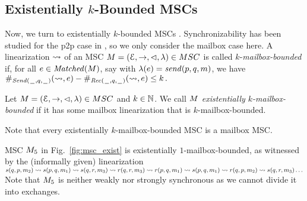 \documentclass[a4paper,UKenglish,cleveref, autoref, thm-restate]{lipics-v2021}
\begin{document}

\subsection{Existentially $k$-Bounded MSCs}

Now, we turn to existentially $k$-bounded MSCs \cite{DBLP:conf/fossacs/LohreyM02,DBLP:conf/dlt/GenestMK04,GKM07}.
Synchronizability has been studied for the p2p case in \cite{GKM07}, so we only consider the mailbox case here.
A linearization $\rightsquigarrow$ of an MSC $\msc = (\Events,\procrel,\lhd,\lambda) \in \MSCs$ is called
$k$-\emph{mailbox-bounded} if, for all $e \in \mathit{Matched}(M)$, say with $\lambda(e) = \mathit{send}(p, q, m)$,
we have $\#_{{\mathit{Send}(\hspace{0.1em}\underline{\hspace{0.5em}}\hspace{0.1em},q,\hspace{0.1em}\underline{\hspace{0.5em}}\hspace{0.1em})}}(\rightsquigarrow,e) - \#_{{\mathit{Rec}(\hspace{0.1em}\underline{\hspace{0.5em}}\hspace{0.1em},q,\hspace{0.1em}\underline{\hspace{0.5em}}\hspace{0.1em})}}(\rightsquigarrow,e) \le k\,.$


\begin{definition}%
Let $\msc = (\Events,\procrel,\lhd,\lambda) \in \MSCs$ and $k \in \mathbb{N}$.
We call $M$
\emph{existentially $k$-mailbox-bounded} if
it has some mailbox linearization that is $k$-mailbox-bounded.
\end{definition}

\noindent
\begin{minipage}[c]{10.5cm}
  Note that every existentially $k$-mailbox-bounded MSC is a mailbox MSC.
	\begin{example}
MSC $M_{5}$ in Fig.~\ref{fig:msc_exist}
is %
existentially $1$-mailbox-bounded, as witnessed by the (informally given)
linearization
$\ssymb(q,p,\msg_2) \lin \ssymb(p,q,\msg_1) \lin \ssymb(q,r,\msg_3) \lin \rsymb(q,r, \msg_3) \lin \rsymb(p,q, \msg_1) \lin
  \ssymb(p,q,\msg_1) \lin \rsymb(q,p, \msg_2) \lin \ssymb(q,r,\msg_3)
\ldots $
Note that $M_{5}$ is neither weakly nor strongly synchronous as we cannot divide it into exchanges.
	\end{example}
\end{minipage}
\begin{minipage}[c]{3.5cm}
	
\end{minipage}
\end{document}
